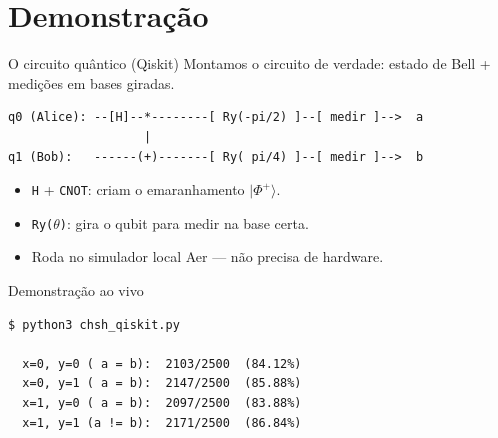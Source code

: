 \documentclass[aspectratio=169]{beamer}
\begin{document}
{

\section{Demonstração}

\begin{frame}[fragile]{O circuito quântico (Qiskit)}
Montamos o circuito de verdade: estado de Bell + medições em bases giradas.
\begin{verbatim}
q0 (Alice): --[H]--*--------[ Ry(-pi/2) ]--[ medir ]-->  a
                   |
q1 (Bob):   ------(+)-------[ Ry( pi/4) ]--[ medir ]-->  b
\end{verbatim}
  \begin{itemize}
    \item \texttt{H} + \texttt{CNOT}: criam o emaranhamento $\lvert\Phi^+\rangle$.
    \item \texttt{Ry($\theta$)}: gira o qubit para medir na base certa.
    \item Roda no simulador local \alert{Aer} — não precisa de hardware.
  \end{itemize}
\end{frame}

\begin{frame}[fragile]{Demonstração ao vivo}
\begin{verbatim}
$ python3 chsh_qiskit.py

  x=0, y=0 ( a = b):  2103/2500  (84.12%)
  x=0, y=1 ( a = b):  2147/2500  (85.88%)
  x=1, y=0 ( a = b):  2097/2500  (83.88%)
  x=1, y=1 (a != b):  2171/2500  (86.84%)


\end{verbatim}
\end{frame}}
\end{document}
